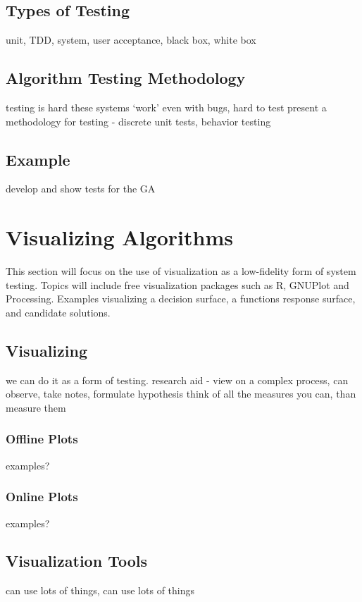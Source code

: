 \subsection{Types of Testing}
unit, TDD, system, user acceptance, black box, white box

\subsection{Algorithm Testing Methodology}
testing is hard
these systems `work' even with bugs, hard to test
present a methodology for testing - discrete unit tests, behavior testing

\subsection{Example}
develop and show tests for the GA

% 
% 
\section{Visualizing Algorithms}
\label{advanced:sec:visualizing}
This section will focus on the use of visualization as a low-fidelity form of system testing. Topics will include free visualization packages such as R, GNUPlot and Processing. Examples visualizing a decision surface, a functions response surface, and candidate solutions.

\subsection{Visualizing}
we can do it as a form of testing.
research aid - view on a complex process, can observe, take notes, formulate hypothesis
think of all the measures you can, than measure them

\subsubsection{Offline Plots}
examples?

\subsubsection{Online Plots}
examples?


\subsection{Visualization Tools}
can use lots of things, can use lots of things

